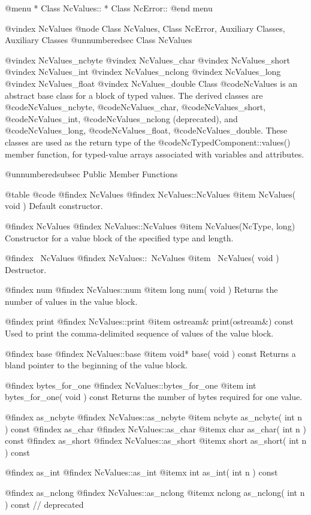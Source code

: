 @menu
* Class NcValues::              
* Class NcError::               
@end menu

@vindex NcValues
@node Class NcValues, Class NcError, Auxiliary Classes, Auxiliary Classes
@unnumberedsec  Class NcValues

@vindex NcValues_ncbyte
@vindex NcValues_char
@vindex NcValues_short
@vindex NcValues_int
@vindex NcValues_nclong
@vindex NcValues_long
@vindex NcValues_float
@vindex NcValues_double
Class @code{NcValues} is an abstract base class for a block of typed
values.  The derived classes are @code{NcValues_ncbyte},
@code{NcValues_char}, @code{NcValues_short}, @code{NcValues_int},
@code{NcValues_nclong} (deprecated), and  @code{NcValues_long},
@code{NcValues_float}, @code{NcValues_double}.
These classes are used as the return type of the
@code{NcTypedComponent::values()} member function, for typed-value
arrays associated with variables and attributes.

@unnumberedsubsec Public Member Functions

@table @code
@findex NcValues
@findex NcValues::NcValues
@item NcValues( void )
Default constructor.

@findex NcValues
@findex NcValues::NcValues
@item NcValues(NcType, long)
Constructor for a value block of the specified type and length.

@findex ~NcValues
@findex NcValues::~NcValues
@item ~NcValues( void )
Destructor.

@findex num
@findex NcValues::num
@item long num( void )
Returns the number of values in the value block.

@findex print
@findex NcValues::print
@item ostream& print(ostream&) const
Used to print the comma-delimited sequence of values of the value block.

@findex base
@findex NcValues::base
@item void* base( void ) const
Returns a bland pointer to the beginning of the value block.

@findex bytes_for_one
@findex NcValues::bytes_for_one
@item int bytes_for_one( void ) const
Returns the number of bytes required for one value.

@findex as_ncbyte
@findex NcValues::as_ncbyte
@item ncbyte as_ncbyte( int n ) const
@findex as_char
@findex NcValues::as_char
@itemx char as_char( int n ) const
@findex as_short
@findex NcValues::as_short
@itemx short as_short( int n ) const

@findex as_int
@findex NcValues::as_int
@itemx int as_int( int n ) const

@findex as_nclong
@findex NcValues::as_nclong
@itemx nclong as_nclong( int n ) const // deprecated

